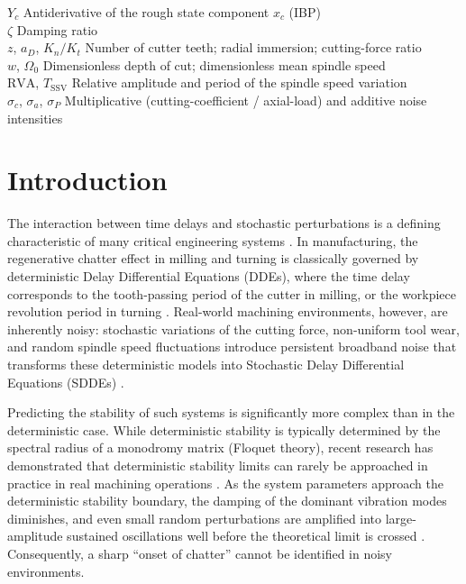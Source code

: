 \documentclass[preprint,12pt]{elsarticle}
\begin{document}
\begin{tabbing}
  $Y_c$ \> Antiderivative of the rough state component $x_c$ (IBP) \\
  $\zeta$ \> Damping ratio \\
  $z$, $a_D$, $K_n/K_t$ \> Number of cutter teeth; radial immersion; cutting-force ratio \\
  $w$, $\Omega_0$ \> Dimensionless depth of cut; dimensionless mean spindle speed \\
  $\mathrm{RVA}$, $T_{\mathrm{SSV}}$ \> Relative amplitude and period of the spindle speed variation \\
  $\sigma_c$, $\sigma_a$, $\sigma_P$ \> Multiplicative (cutting-coefficient / axial-load) and additive noise intensities
\end{tabbing}

\section{Introduction}
\label{sec:intro}

The interaction between time delays and stochastic perturbations is a defining characteristic of many critical engineering systems \cite{Stepan1989, Tobias1965, Tlusty1954, Altintas2012}. In manufacturing, the regenerative chatter effect in milling and turning is classically governed by deterministic Delay Differential Equations (DDEs), where the time delay corresponds to the tooth-passing period of the cutter in milling, or the workpiece revolution period in turning \cite{Altintas2012, Insperger2011, Munoa2016, Quintana2011}. Real-world machining environments, however, are inherently noisy: stochastic variations of the cutting force, non-uniform tool wear, and random spindle speed fluctuations introduce persistent broadband noise that transforms these deterministic models into Stochastic Delay Differential Equations (SDDEs) \cite{Long2007, Fodor2020, Sykora2021_MSSP}.

Predicting the stability of such systems is significantly more complex than in the deterministic case. While deterministic stability is typically determined by the spectral radius of a monodromy matrix (Floquet theory), recent research has demonstrated that deterministic stability limits can rarely be approached in practice in real machining operations \cite{Sykora2021_MSSP}. As the system parameters approach the deterministic stability boundary, the damping of the dominant vibration modes diminishes, and even small random perturbations are amplified into large-amplitude sustained oscillations well before the theoretical limit is crossed \cite{Sykora2021_MSSP, Bachrathy2021_CIRP}. Consequently, a sharp ``onset of chatter'' cannot be identified in noisy environments.
\end{document}
